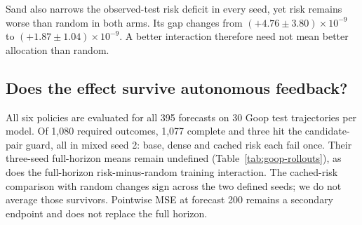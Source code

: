 Sand also narrows the observed-test risk deficit in every seed, yet risk remains worse than random in both arms. Its gap changes from $(+4.76\pm3.80)\times10^{-9}$ to $(+1.87\pm1.04)\times10^{-9}$. A better interaction therefore need not mean better allocation than random.

\subsection{Does the effect survive autonomous feedback?}
All six policies are evaluated for all 395 forecasts on 30 Goop test trajectories per model. Of 1,080 required outcomes, 1,077 complete and three hit the candidate-pair guard, all in mixed seed 2: base, dense and cached risk each fail once. Their three-seed full-horizon means remain undefined (Table~\ref{tab:goop-rollouts}), as does the full-horizon risk-minus-random training interaction. The cached-risk comparison with random changes sign across the two defined seeds; we do not average those survivors. Pointwise MSE at forecast 200 remains a secondary endpoint and does not replace the full horizon.

